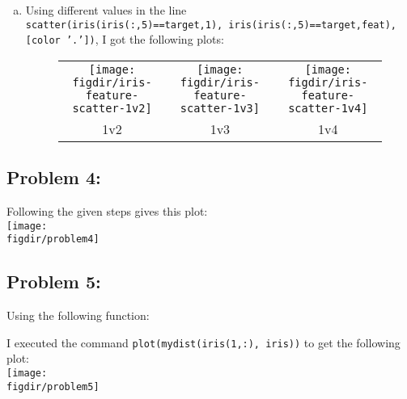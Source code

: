 \documentclass[twoside,11pt]{article}
\newcommand{\figdir}{figs}
\theoremstyle{definition}
\begin{document}
\begin{enumerate}[(a)]
\item Using different values in the line \\
\texttt{scatter(iris(iris(:,5)==target,1), iris(iris(:,5)==target,feat), [color '.'])},
I got the following plots:
\begin{figure}[h!] \centering
\begin{tabular}{ccc}
\texttt{[image: \\figdir/iris-feature-scatter-1v2]} &
\texttt{[image: \\figdir/iris-feature-scatter-1v3]} &
\texttt{[image: \\figdir/iris-feature-scatter-1v4]} \\
1v2 & 1v3 & 1v4
\end{tabular}
\end{figure}
\end{enumerate}


\subsection*{Problem 4: }

Following the given steps gives this plot:\\
\texttt{[image: \\figdir/problem4]}

\subsection*{Problem 5: }

Using the following function:


I executed the command \texttt{plot(mydist(iris(1,:), iris))} to get the following plot:\\
\texttt{[image: \\figdir/problem5]} \\
\end{document}
